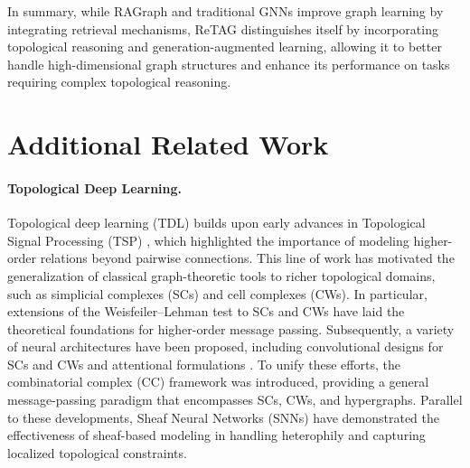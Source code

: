 In summary, while RAGraph and traditional GNNs improve graph learning by integrating retrieval mechanisms, ReTAG distinguishes itself by incorporating topological reasoning and generation-augmented learning, allowing it to better handle high-dimensional graph structures and enhance its performance on tasks requiring complex topological reasoning.

\section{Additional Related Work}
\label{app:related}
\paragraph{Topological Deep Learning.} 
Topological deep learning (TDL) builds upon early advances in Topological Signal Processing (TSP) \cite{barbarossa2020topological, schaub2021signal, roddenberry2022cellsp, sardellitti2022cell}, which highlighted the importance of modeling higher-order relations beyond pairwise connections. This line of work has motivated the generalization of classical graph-theoretic tools to richer topological domains, such as simplicial complexes (SCs) and cell complexes (CWs). In particular, extensions of the Weisfeiler–Lehman test to SCs and CWs \cite{bodnar2021weisfeiler, DBLP:conf/nips/BodnarFOWLMB21} have laid the theoretical foundations for higher-order message passing. Subsequently, a variety of neural architectures have been proposed, including convolutional designs for SCs and CWs \cite{ebli2020simplicial, yang2022effsimpl, hajij2020cell, yang2023convolutional, roddenberry2021principled, hajij2022} and attentional formulations \cite{goh2022simplicial, giusti2023cell}. To unify these efforts, the combinatorial complex (CC) framework \cite{hajij2023topological} was introduced, providing a general message-passing paradigm that encompasses SCs, CWs, and hypergraphs. Parallel to these developments, Sheaf Neural Networks (SNNs) \cite{HGh19, hansen2020sheaf, sheaf2022, battiloro2022tangent, battiloro2024tangent, barbero2022sheaf} have demonstrated the effectiveness of sheaf-based modeling in handling heterophily and capturing localized topological constraints.

